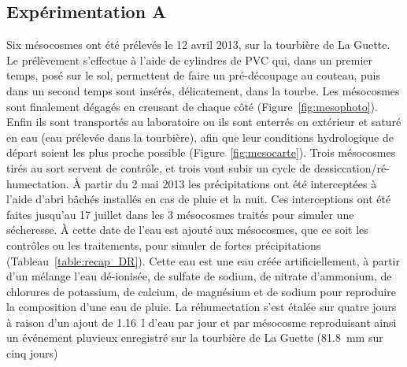 \subsection{Expérimentation A}
Six mésocosmes ont été prélevés le 12 avril 2013, sur la tourbière de La Guette.
Le prélèvement s'effectue à l'aide de cylindres de PVC qui, dans un premier temps, posé sur le sol, permettent de faire un pré-découpage au couteau, puis dans un second temps sont insérés, délicatement, dans la tourbe. 
Les mésocosmes sont finalement dégagés en creusant de chaque côté (Figure~\ref{fig:mesophoto}).
Enfin ils sont transportés au laboratoire ou ils sont enterrés en extérieur et saturé en eau (eau prélevée dans la tourbière), afin que leur conditions hydrologique de départ soient les plus proche possible (Figure~\ref{fig:mesocarte}).
Trois mésocosmes tirés au sort servent de contrôle, et trois vont subir un cycle de dessiccation/ré-humectation.
À partir du 2 mai 2013 les précipitations ont été interceptées à l'aide d'abri bâchés installés en cas de pluie et la nuit.
Ces interceptions ont été faites jusqu'au 17 juillet dans les 3 mésocosmes traités pour simuler une sécheresse.
À cette date de l'eau est ajouté aux mésocosmes, que ce soit les contrôles ou les traitements, pour simuler de fortes précipitations (Tableau~\ref{table:recap_DR}).
Cette eau est une eau créée artificiellement, à partir d'un mélange l'eau dé-ionisée, de sulfate de sodium, de nitrate d'ammonium, de chlorures de potassium, de calcium, de magnésium et de sodium pour reproduire la composition d'une eau de pluie.
La réhumectation s'est étalée sur quatre jours à raison d'un ajout de \SI{1.16}{\litre} d'eau par jour et par mésocosme reproduisant ainsi un événement pluvieux enregistré sur la tourbière de La Guette (\SI{81.8}{\milli\metre} sur cinq jours)

